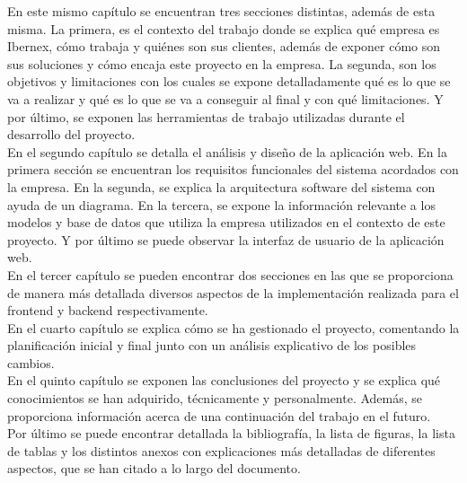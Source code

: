 En este mismo capítulo se encuentran tres secciones distintas, además de esta misma. La primera, es el contexto del trabajo donde se explica qué empresa es Ibernex, cómo trabaja y quiénes son sus clientes, además de exponer cómo son sus soluciones y cómo encaja este proyecto en la empresa. La segunda, son los objetivos y limitaciones con los cuales se expone detalladamente qué es lo que se va a realizar y qué es lo que se va a conseguir al final y con qué limitaciones. Y por último, se exponen las herramientas de trabajo utilizadas durante el desarrollo del proyecto.\\

En el segundo capítulo se detalla el análisis y diseño de la aplicación web. En la primera sección se encuentran los requisitos funcionales del sistema acordados con la empresa. En la segunda, se explica la arquitectura software del sistema con ayuda de un diagrama. En la tercera, se expone la información relevante a los modelos y base de datos que utiliza la empresa utilizados en el contexto de este proyecto. Y por último se puede observar la interfaz de usuario de la aplicación web. \\

En el tercer capítulo se pueden encontrar dos secciones en las que se proporciona de manera más detallada diversos aspectos de la implementación realizada para el frontend y backend respectivamente.\\

En el cuarto capítulo se explica cómo se ha gestionado el proyecto, comentando la planificación inicial y final junto con un análisis explicativo de los posibles cambios.\\

En el quinto capítulo se exponen las conclusiones del proyecto y se explica qué conocimientos se han adquirido, técnicamente y personalmente. Además, se proporciona información acerca de una continuación del trabajo en el futuro.\\

Por último se puede encontrar detallada la bibliografía, la lista de figuras, la lista de tablas y los distintos anexos con explicaciones más detalladas de diferentes aspectos, que se han citado a lo largo del documento.








